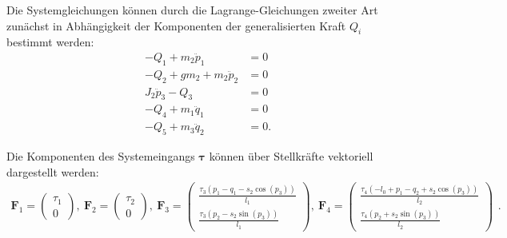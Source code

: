 Die Systemgleichungen können durch die Lagrange-Gleichungen zweiter Art zunächst in Abhängigkeit der Komponenten der generalisierten Kraft $Q_i$ bestimmt werden:
\begin{subequations}
	\begin{align}
		- Q_{1} + m_{2} \ddot{p}_{1} &= 0\\
		- Q_{2} + g m_{2} + m_{2} \ddot{p}_{2} &= 0\\
		J_{2} \ddot{p}_{3} - Q_{3} &= 0\\
		- Q_{4} + m_{1} \ddot{q}_{1} &= 0\\
		- Q_{5} + m_{3} \ddot{q}_{2} &= 0.
	\end{align}
\end{subequations}

Die Komponenten des Systemeingangs $\boldsymbol{\tau}$ können über Stellkräfte vektoriell dargestellt werden:
\begin{equation}
	\begin{smallmatrix}
		\mathbf{F}_1 =
		\left(\begin{matrix}
			\tau_{1} \\
			0
		\end{matrix}\right), \
		\mathbf{F}_2 =
		\left(\begin{matrix}
			\tau_{2} \\
			0
		\end{matrix}\right), \
		\mathbf{F}_3 =
		\left(\begin{matrix}
			\frac{\tau_{3} \left(p_{1} - q_{1} - s_{2} \cos{\left(p_{3} \right)}\right)}{l_{1}}\\
			\frac{\tau_{3} \left(p_{2} - s_{2} \sin{\left(p_{3} \right)}\right)}{l_{1}}
		\end{matrix}\right), \
		\mathbf{F}_4 =
		\left(\begin{matrix}
			\frac{\tau_{4} \left(- l_{0} + p_{1} - q_{2} + s_{2} \cos{\left(p_{3} \right)}\right)}{l_{2}}\\
			\frac{\tau_{4} \left(p_{2} + s_{2} \sin{\left(p_{3} \right)}\right)}{l_{2}}
		\end{matrix}\right)
	\end{smallmatrix}.
\end{equation}

